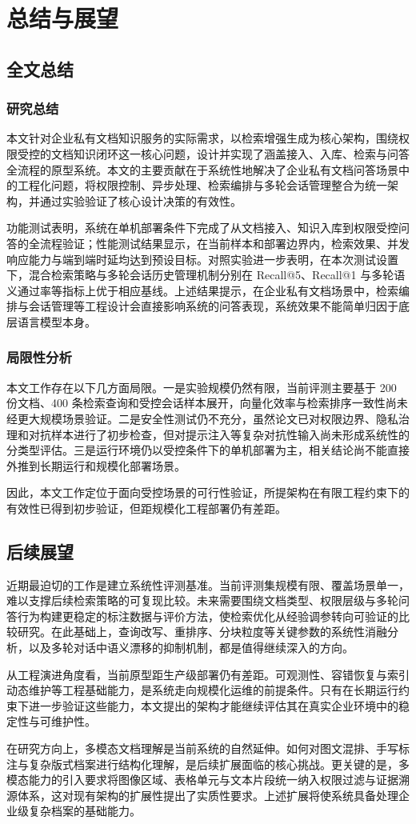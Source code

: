 \chapter{总结与展望}
\label{cha:conclusion}

\section{全文总结}

\subsection{研究总结}

本文针对企业私有文档知识服务的实际需求，以检索增强生成为核心架构，围绕权限受控的文档知识闭环这一核心问题，设计并实现了涵盖接入、入库、检索与问答全流程的原型系统。本文的主要贡献在于系统性地解决了企业私有文档问答场景中的工程化问题，将权限控制、异步处理、检索编排与多轮会话管理整合为统一架构，并通过实验验证了核心设计决策的有效性。

功能测试表明，系统在单机部署条件下完成了从文档接入、知识入库到权限受控问答的全流程验证；性能测试结果显示，在当前样本和部署边界内，检索效果、并发响应能力与端到端时延均达到预设目标。对照实验进一步表明，在本次测试设置下，混合检索策略与多轮会话历史管理机制分别在 Recall@5、Recall@1 与多轮语义通过率等指标上优于相应基线。上述结果提示，在企业私有文档场景中，检索编排与会话管理等工程设计会直接影响系统的问答表现，系统效果不能简单归因于底层语言模型本身。

\subsection{局限性分析}

本文工作存在以下几方面局限。一是实验规模仍然有限，当前评测主要基于 200 份文档、400 条检索查询和受控会话样本展开，向量化效率与检索排序一致性尚未经更大规模场景验证。二是安全性测试仍不充分，虽然论文已对权限边界、隐私治理和对抗样本进行了初步检查，但对提示注入等复杂对抗性输入尚未形成系统性的分类型评估。三是运行环境仍以受控条件下的单机部署为主，相关结论尚不能直接外推到长期运行和规模化部署场景。

因此，本文工作定位于面向受控场景的可行性验证，所提架构在有限工程约束下的有效性已得到初步验证，但距规模化工程部署仍有差距。

\section{后续展望}

近期最迫切的工作是建立系统性评测基准。当前评测集规模有限、覆盖场景单一，难以支撑后续检索策略的可复现比较。未来需要围绕文档类型、权限层级与多轮问答行为构建更稳定的标注数据与评价方法，使检索优化从经验调参转向可验证的比较研究。在此基础上，查询改写、重排序、分块粒度等关键参数的系统性消融分析，以及多轮对话中语义漂移的抑制机制，都是值得继续深入的方向。

从工程演进角度看，当前原型距生产级部署仍有差距。可观测性、容错恢复与索引动态维护等工程基础能力，是系统走向规模化运维的前提条件。只有在长期运行约束下进一步验证这些能力，本文提出的架构才能继续评估其在真实企业环境中的稳定性与可维护性。

在研究方向上，多模态文档理解是当前系统的自然延伸。如何对图文混排、手写标注与复杂版式档案进行结构化理解，是后续扩展面临的核心挑战。更关键的是，多模态能力的引入要求将图像区域、表格单元与文本片段统一纳入权限过滤与证据溯源体系，这对现有架构的扩展性提出了实质性要求。上述扩展将使系统具备处理企业级复杂档案的基础能力。
